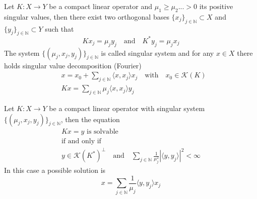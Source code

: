 \begin{theorem}
Let $K: X\to Y$ be a compact linear operator and $\mu_1\geq\mu_2...>0$ its positive singular values, then there exist two orthogonal bases $\{x_j\}_{j \in \mathbb{N}}\subset X$ and $\{y_j\}_{j \in \mathbb{N}}\subset Y$ such that
\begin{equation}
 Kx_j = \mu_j y_j \quad \text{and}\quad K^* y_j = \mu_j x_j
\end{equation}
The system $\{(\mu_j,x_j,y_j)\}_{j \in \mathbb{N}}$ is called singular system and for any $x \in X$ there holds singular value decomposition (Fourier)
\begin{align}
 & x = x_0 + \sum_{j \in \mathbb{N}} \langle x, x_j \rangle x_j\quad \text{with}\quad x_0 \in \mathcal{K}(K) \\
 & Kx = \sum_{j \in \mathbb{N}} \mu_j \langle x, x_j \rangle y_j
\end{align}
\end{theorem}

\begin{theorem}[Picard]
Let $K: X \to Y$ be a compact linear operator with singular system $\{(\mu_j,x_j,y_j)\}_{j \in \mathbb{N}}$, then the equation
\begin{gather}
 Kx = y \,\,\text{is solvable}\\
 \text{if and only if}\\
 y \in \mathcal{K}(K^*)^\perp\quad\text{and} \quad \sum_{j \in \mathbb{N}}\frac{1}{\mu_j^2}|\langle y,y_j\rangle|^2< \infty
\end{gather}
In this case a possible solution is
\begin{equation}
 x = \sum_{j \in \mathbb{N}}\frac{1}{\mu_j}\langle y,y_j\rangle x_j
\end{equation}
\end{theorem}

